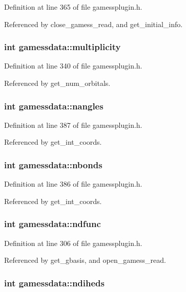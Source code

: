 Definition at line 365 of file gamessplugin.h.

Referenced by close\_\-gamess\_\-read, and get\_\-initial\_\-info.
\subsubsection{\setlength{\rightskip}{0pt plus 5cm}int gamessdata::multiplicity}\label{structgamessdata_m22}




Definition at line 340 of file gamessplugin.h.

Referenced by get\_\-num\_\-orbitals.
\subsubsection{\setlength{\rightskip}{0pt plus 5cm}int gamessdata::nangles}\label{structgamessdata_m41}




Definition at line 387 of file gamessplugin.h.

Referenced by get\_\-int\_\-coords.
\subsubsection{\setlength{\rightskip}{0pt plus 5cm}int gamessdata::nbonds}\label{structgamessdata_m40}




Definition at line 386 of file gamessplugin.h.

Referenced by get\_\-int\_\-coords.
\subsubsection{\setlength{\rightskip}{0pt plus 5cm}int gamessdata::ndfunc}\label{structgamessdata_m8}




Definition at line 306 of file gamessplugin.h.

Referenced by get\_\-gbasis, and open\_\-gamess\_\-read.
\subsubsection{\setlength{\rightskip}{0pt plus 5cm}int gamessdata::ndiheds}\label{structgamessdata_m42}




